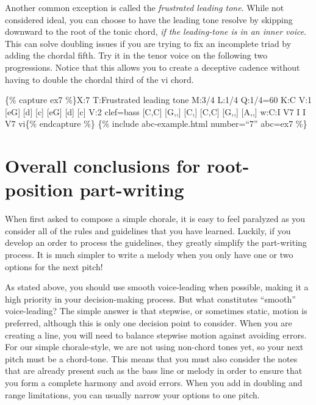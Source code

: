 \documentclass{book}
\begin{document}
Another common exception is called the \emph{frustrated leading tone}. While
not considered ideal, you can choose to have the leading tone resolve by
skipping downward to the root of the tonic chord, \emph{if the leading-tone is
in an inner voice}. This can solve doubling issues if you are trying to fix an
incomplete triad by adding the chordal fifth. Try it in the tenor voice on the
following two progressions. Notice that this allows you to create a deceptive
cadence without having to double the chordal third of the vi chord.

\{\% capture ex7 \%\}X:7 T:Frustrated leading tone M:3/4 L:1/4 Q:1/4=60 K:C
V:1 {[}eG{]} {[}d{]} {[}c{]}\textbar\textbar{} {[}eG{]} {[}d{]}
{[}c{]}\textbar{]} V:2 clef=bass {[}C,C{]} {[}G,,{]}
{[}C,{]}\textbar\textbar{} {[}C,C{]} {[}G,,{]} {[}A,,{]}\textbar{]} w:C:I V7 I
I V7 vi\{\% endcapture \%\} \{\% include abc-example.html number=``7'' abc=ex7
\%\}

\hypertarget{overall-conclusions-for-root-position-part-writing}{%
\section{Overall conclusions for root-position
part-writing}\label{overall-conclusions-for-root-position-part-writing}}

When first asked to compose a simple chorale, it is easy to feel paralyzed as
you consider all of the rules and guidelines that you have learned. Luckily,
if you develop an order to process the guidelines, they greatly simplify the
part-writing process. It is much simpler to write a melody when you only have
one or two options for the next pitch!

As stated above, you should use smooth voice-leading when possible, making it
a high priority in your decision-making process. But what constitutes
``smooth'' voice-leading? The simple answer is that stepwise, or sometimes
static, motion is preferred, although this is only one decision point to
consider. When you are creating a line, you will need to balance stepwise
motion against avoiding errors. For our simple chorale-style, we are not using
non-chord tones yet, so your next pitch must be a chord-tone. This means that
you must also consider the notes that are already present such as the bass
line or melody in order to ensure that you form a complete harmony and avoid
errors. When you add in doubling and range limitations, you can usually narrow
your options to one pitch.
\end{document}
